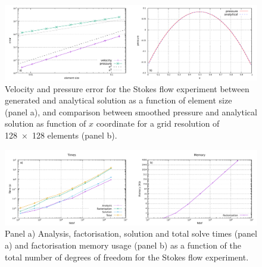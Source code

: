 \documentclass[hidelinks,10pt,a4paper]{article}
\begin{document}
\begin{figure}
\centering
\noindent\includegraphics[width=\textwidth]{./Figures/errors.pdf}
\caption{Velocity and pressure error for the Stokes flow experiment between generated and analytical solution as a function of element size (panel a),
and comparison between smoothed pressure and analytical solution as function of $x$ coordinate for a grid resolution of \num{128x128} elements (panel b).}
\label{fig:errors}
\end{figure}

\begin{figure}
\noindent\includegraphics[width=\textwidth]{./Figures/MUMPS.pdf}
\caption{Panel a) Analysis, factorisation, solution and total solve times (panel a) and factorisation memory usage (panel b) as a function of the total number
of degrees of freedom for the Stokes flow experiment.}
\label{fig:MUMPS}
\end{figure}
\end{document}
